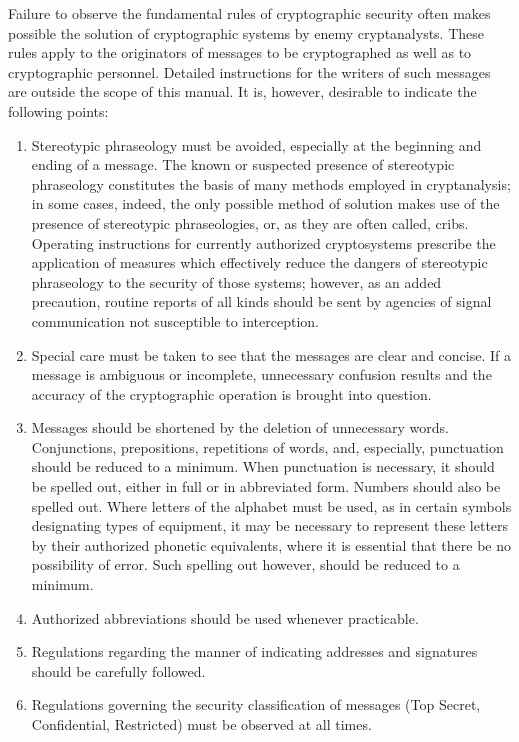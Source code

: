 \mypara Failure to observe the fundamental rules of cryptographic security
often makes possible the solution of cryptographic systems by enemy
cryptanalysts. These rules apply to the originators of messages to be
cryptographed as well as to cryptographic personnel. Detailed instructions for the writers of such messages are outside the scope of this
manual. It is, however, desirable to indicate the following points:
\begin{enumerate}

\item Stereotypic phraseology must be avoided, especially at the
beginning and ending of a message. The known or suspected
presence of stereotypic phraseology constitutes the basis of
many methods employed in cryptanalysis; in some cases, indeed,
the only possible method of solution makes use of the presence
of stereotypic phraseologies, or, as they are often called, cribs.
Operating instructions for currently authorized cryptosystems
prescribe the application of measures which effectively reduce
the dangers of stereotypic phraseology to the security of those
systems; however, as an added precaution, routine reports of
all kinds should be sent by agencies of signal communication
not susceptible to interception.

\item Special care must be taken to see that the messages are clear and
concise. If a message is ambiguous or incomplete, unnecessary
confusion results and the accuracy of the cryptographic operation is brought into question.

\item Messages should be shortened by the deletion of unnecessary
words. Conjunctions, prepositions, repetitions of words, and,
especially, punctuation should be reduced to a minimum. When
punctuation is necessary, it should be spelled out, either in full
or in abbreviated form. Numbers should also be spelled out.
Where letters of the alphabet must be used, as in certain symbols designating types of equipment, it may be necessary to
represent these letters by their authorized phonetic equivalents,
where it is essential that there be no possibility of error. Such
spelling out however, should be reduced to a minimum.

\item Authorized abbreviations should be used whenever practicable.

\item Regulations regarding the manner of indicating addresses and
signatures should be carefully followed.

\item Regulations governing the security classiﬁcation of messages
(Top Secret, Conﬁdential, Restricted) must be observed at all
times.
\end{enumerate}

